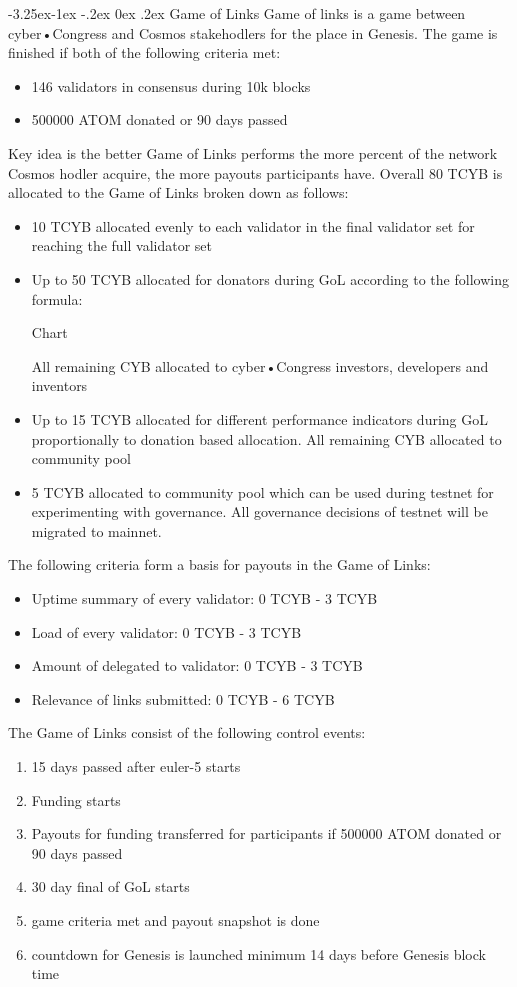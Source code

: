 \documentclass[8pt,oneside]{amsart}
\makeatletter
\renewcommand\subsection{\@startsection{subsection}{2}{\z@}%
                                     {-3.25ex\@plus -1ex \@minus -.2ex}%
                                     {0ex \@plus .2ex}%
                                     {\play\Large}}%
\newcommand{\titleSection}[1]{\subsection{#1}}
\makeatother
\begin{document}
\titleSection{Game of Links}\label{gol}
Game of links is a game between cyber•Congress and Cosmos stakehodlers for the place in Genesis. The game is finished if both of the following criteria met:
\begin{itemize}
\item 146 validators in consensus during 10k blocks
\item 500000 ATOM donated or 90 days passed
\end{itemize}

Key idea is the better Game of Links performs the more percent of the network Cosmos hodler acquire, the more payouts participants have. Overall 80 TCYB is allocated to the Game of Links broken down as follows:

\begin{itemize}
\item 10 TCYB allocated evenly to each validator in the final validator set for reaching the full validator set
\item Up to 50 TCYB allocated for donators during GoL according to the following formula:

Chart

All remaining CYB allocated to cyber•Congress investors, developers and inventors
\item Up to 15 TCYB allocated for different performance indicators during GoL proportionally to donation based allocation. All remaining CYB allocated to community pool
\item 5 TCYB allocated to community pool which can be used during testnet for experimenting with governance. All governance decisions of testnet will be migrated to mainnet.
\end{itemize}

The following criteria form a basis for payouts in the Game of Links:
\begin{itemize}
\item Uptime summary of every validator: 0 TCYB - 3 TCYB
\item Load of every validator: 0 TCYB - 3 TCYB
\item Amount of delegated to validator: 0 TCYB - 3 TCYB
\item Relevance of links submitted: 0 TCYB - 6 TCYB
\end{itemize}

The Game of Links consist of the following control events:
\begin{enumerate}
\item 15 days passed after euler-5 starts
\item Funding starts
\item Payouts for funding transferred for participants if 500000 ATOM donated or 90 days passed
\item 30 day final of GoL starts
\item game criteria met and payout snapshot is done
\item countdown for Genesis is launched minimum 14 days before Genesis block time
\end{enumerate}
\end{document}
